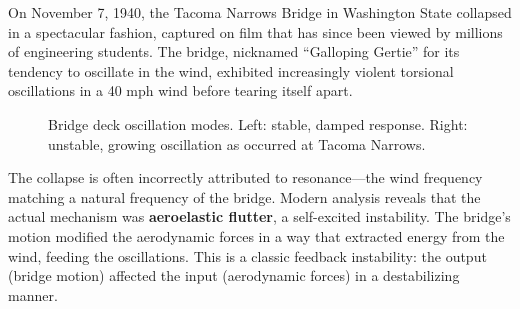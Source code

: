 On November 7, 1940, the Tacoma Narrows Bridge in Washington State collapsed in a spectacular fashion, captured on film that has since been viewed by millions of engineering students. The bridge, nicknamed ``Galloping Gertie'' for its tendency to oscillate in the wind, exhibited increasingly violent torsional oscillations in a 40 mph wind before tearing itself apart.

\begin{figure}[H]
\centering
{}
\caption{Bridge deck oscillation modes. Left: stable, damped response. Right: unstable, growing oscillation as occurred at Tacoma Narrows.}
\label{fig:tacoma}
\end{figure}

The collapse is often incorrectly attributed to resonance---the wind frequency matching a natural frequency of the bridge. Modern analysis reveals that the actual mechanism was \textbf{aeroelastic flutter}, a self-excited instability. The bridge's motion modified the aerodynamic forces in a way that extracted energy from the wind, feeding the oscillations. This is a classic feedback instability: the output (bridge motion) affected the input (aerodynamic forces) in a destabilizing manner.

